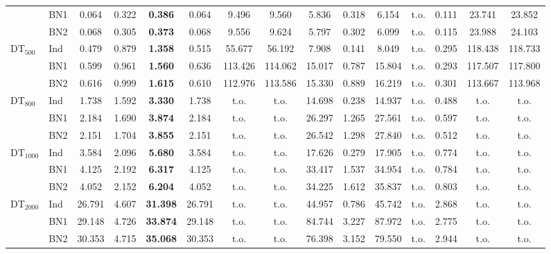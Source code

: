 \begin{table}[!t]
{\begin{tabular}{llccccccccccccc}
                    & BN1  & 0.064 & 0.322 & \textbf{0.386} & 0.064 & 9.496 & 9.560 & 5.836 & 0.318 & 6.154 & t.o. & 0.111 & 23.741 & 23.852 \\
                    & BN2  & 0.068 & 0.305 & \textbf{0.373} & 0.068 & 9.556 & 9.624 & 5.797 & 0.302 & 6.099 & t.o. & 0.115 & 23.988 & 24.103 \\
  \midrule
  DT$_{500}$        & Ind  & 0.479 & 0.879 & \textbf{1.358} & 0.515 & 55.677 & 56.192 & 7.908 & 0.141 & 8.049 & t.o. & 0.295 & 118.438 & 118.733 \\
                    & BN1  & 0.599 & 0.961 & \textbf{1.560} & 0.636 & 113.426 & 114.062 & 15.017 & 0.787 & 15.804 & t.o. & 0.293 & 117.507 & 117.800 \\
                    & BN2  & 0.616 & 0.999 & \textbf{1.615} & 0.610 & 112.976 & 113.586 & 15.330 & 0.889 & 16.219 & t.o. & 0.301 & 113.667 & 113.968 \\
  \midrule
  DT$_{800}$        & Ind  & 1.738 & 1.592 & \textbf{3.330} & 1.738 & t.o. & t.o. & 14.698 & 0.238 & 14.937 & t.o. & 0.488 & t.o. & t.o. \\
                    & BN1  & 2.184 & 1.690 & \textbf{3.874} & 2.184 & t.o. & t.o. & 26.297 & 1.265 & 27.561 & t.o. & 0.597 & t.o. & t.o. \\
                    & BN2  & 2.151 & 1.704 & \textbf{3.855} & 2.151 & t.o. & t.o. & 26.542 & 1.298 & 27.840 & t.o. & 0.512 & t.o. & t.o. \\
  \midrule
  DT$_{1000}$       & Ind  & 3.584 & 2.096 & \textbf{5.680} & 3.584 & t.o. & t.o. & 17.626 & 0.279 & 17.905 & t.o. & 0.774 & t.o. & t.o. \\
                    & BN1  & 4.125 & 2.192 & \textbf{6.317} & 4.125 & t.o. & t.o. & 33.417 & 1.537 & 34.954 & t.o. & 0.784 & t.o. & t.o. \\
                    & BN2  & 4.052 & 2.152 & \textbf{6.204} & 4.052 & t.o. & t.o. & 34.225 & 1.612 & 35.837 & t.o. & 0.803 & t.o. & t.o. \\
  \midrule
  DT$_{2000}$       & Ind  & 26.791 & 4.607 & \textbf{31.398} & 26.791 & t.o. & t.o. & 44.957 & 0.786 & 45.742 & t.o. & 2.868 & t.o. & t.o. \\
                    & BN1  & 29.148 & 4.726 & \textbf{33.874} & 29.148 & t.o. & t.o. & 84.744 & 3.227 & 87.972 & t.o. & 2.775 & t.o. & t.o. \\
                    & BN2  & 30.353 & 4.715 & \textbf{35.068} & 30.353 & t.o. & t.o. & 76.398 & 3.152 & 79.550 & t.o. & 2.944 & t.o. & t.o. \\

\end{tabular}}
\end{table}
